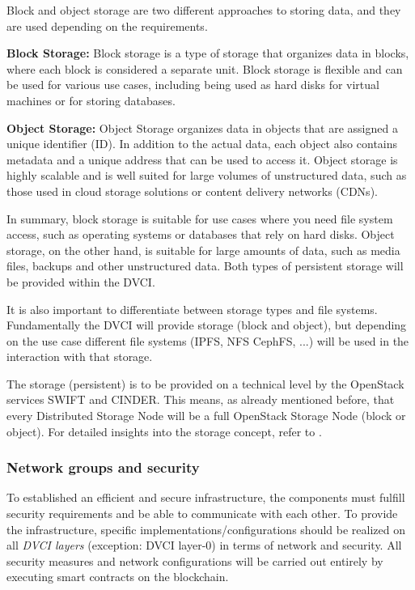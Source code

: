 \documentclass[]{article}
\begin{document}
Block and object storage are two different approaches to storing data, and they are used depending on the requirements.
\newline

\textbf{Block Storage:}
Block storage is a type of storage that organizes data in blocks, where each block is considered a separate unit. 
Block storage is flexible and can be used for various use cases, including being used as hard disks for virtual machines or for storing databases. 
\newline
	
\textbf{Object Storage:}
Object Storage organizes data in objects that are assigned a unique identifier (ID). 
In addition to the actual data, each object also contains metadata and a unique address that can be used to access it.
Object storage is highly scalable and is well suited for large volumes of unstructured data, such as those used in cloud storage solutions or content delivery networks (CDNs). 
\newline

In summary, block storage is suitable for use cases where you need file system access, such as operating systems or databases that rely on hard disks.
Object storage, on the other hand, is suitable for large amounts of data, such as media files, backups and other unstructured data.
Both types of persistent storage will be provided within the DVCI.

It is also important to differentiate between storage types and file systems.
Fundamentally the DVCI will provide storage (block and object), but depending on the use case different file systems (IPFS, NFS CephFS, ...) will be used in the interaction with that storage.

The storage (persistent) is to be provided on a technical level by the OpenStack services SWIFT and CINDER. 
This means, as already mentioned before, that every Distributed Storage Node will be a full OpenStack Storage Node (block or object).
For detailed insights into the storage concept, refer to \cite{OpenStackDoc-storage-concept}.

\subsubsection{Network groups and security}
To established an efficient and secure infrastructure, the components must fulfill security requirements and be able to communicate with each other.
To provide the infrastructure, specific implementations/configurations should be realized on all \textit{DVCI layers} (exception: DVCI layer-0) in terms of network and security.
All security measures and network configurations will be carried out entirely by executing smart contracts on the blockchain. 
\end{document}
